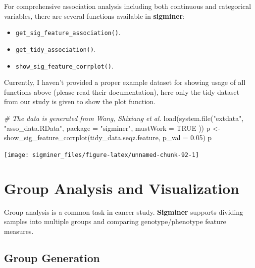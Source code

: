 \documentclass[
  12pt,
  a4paper,
  twoside]{book}
\newenvironment{Shaded}{\begin{snugshade}}{\end{snugshade}}
\newcommand{\AttributeTok}[1]{\textcolor[rgb]{0.77,0.63,0.00}{#1}}
\newcommand{\CommentTok}[1]{\textcolor[rgb]{0.56,0.35,0.01}{\textit{#1}}}
\newcommand{\ConstantTok}[1]{\textcolor[rgb]{0.00,0.00,0.00}{#1}}
\newcommand{\FloatTok}[1]{\textcolor[rgb]{0.00,0.00,0.81}{#1}}
\newcommand{\FunctionTok}[1]{\textcolor[rgb]{0.00,0.00,0.00}{#1}}
\newcommand{\NormalTok}[1]{#1}
\newcommand{\OtherTok}[1]{\textcolor[rgb]{0.56,0.35,0.01}{#1}}
\newcommand{\StringTok}[1]{\textcolor[rgb]{0.31,0.60,0.02}{#1}}
\providecommand{\tightlist}{%
  \setlength{\itemsep}{0pt}\setlength{\parskip}{0pt}}
\begin{document}
For comprehensive association analysis including both continuous and categorical variables,
there are several functions available in \textbf{sigminer}:

\begin{itemize}
\tightlist
\item
  \texttt{get\_sig\_feature\_association()}.
\item
  \texttt{get\_tidy\_association()}.
\item
  \texttt{show\_sig\_feature\_corrplot()}.
\end{itemize}

Currently, I haven't provided a proper example dataset for showing usage of all functions above (please read their documentation), here only the tidy dataset from our study \citep{wang2021copy} is given to show the plot function.

\begin{Shaded}
\begin{Highlighting}[]
\CommentTok{\# The data is generated from Wang, Shixiang et al.}
\FunctionTok{load}\NormalTok{(}\FunctionTok{system.file}\NormalTok{(}\StringTok{"extdata"}\NormalTok{, }\StringTok{"asso\_data.RData"}\NormalTok{,}
  \AttributeTok{package =} \StringTok{"sigminer"}\NormalTok{, }\AttributeTok{mustWork =} \ConstantTok{TRUE}
\NormalTok{))}
\NormalTok{p }\OtherTok{\textless{}{-}} \FunctionTok{show\_sig\_feature\_corrplot}\NormalTok{(tidy\_data.seqz.feature, }\AttributeTok{p\_val =} \FloatTok{0.05}\NormalTok{)}
\NormalTok{p}
\end{Highlighting}
\end{Shaded}

\texttt{[image: sigminer\_files/figure-latex/unnamed-chunk-92-1]}

\hypertarget{group-analysis-and-visualization}{%
\section{Group Analysis and Visualization}\label{group-analysis-and-visualization}}

Group analysis is a common task in cancer study. \textbf{Sigminer} supports dividing samples into multiple groups and comparing genotype/phenotype feature measures.

\hypertarget{group-generation}{%
\subsection{Group Generation}\label{group-generation}}
\end{document}
